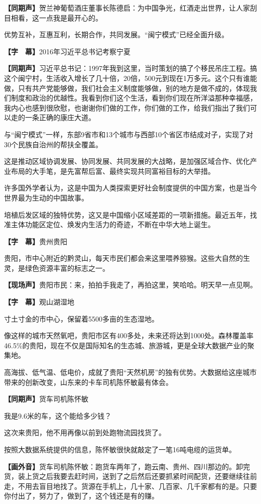 \documentclass{ctexart}
\newcommand{\zkh}[1]{\textbf{\hspace{-2.7em} 【#1】}}
\begin{document}
\zkh{同期声}贺兰神葡萄酒庄董事长陈德启：为中国争光，红酒走出世界，让人家刮目相看，这一点我是最开心的。

优势互补，互惠互利，长期合作，共同发展。``闽宁模式''已经全面升级。

\zkh{字　幕}2016年习近平总书记考察宁夏

\zkh{同期声}习近平总书记：1997年我到这里，当时策划的搞了个移民吊庄工程。搞这个闽宁村，生活收入增长了几十倍，20倍，500元到现在1万多元。这个只有谁能做，只有共产党能够做，我们社会主义制度能够做，别的地方是做不成的，体现我们制度和政治的优越性。我看到你们这个生活，看到你们现在所洋溢那种幸福感，我内心也感到很欣慰，也谢谢你们做的工作，你们做的工作，给我们指出了我们可以走的一条正确的康庄大道。

与``闽宁模式''一样，东部9省市和13个城市与西部10个省区市结成对子，实现了对30个民族自治州的帮扶全覆盖。

这是推动区域协调发展、协同发展、共同发展的大战略，是加强区域合作、优化产业布局的大手笔，是先富帮后富、最终实现共同富裕目标的大举措。

许多国外学者认为，这是中国为人类探索更好社会制度提供的中国方案，也是当今世界最为生动的中国故事。

培植后发区域的独特优势，这又是中国缩小区域差距的一项新措施。最近五年，找准主体功能区定位、焕发内生活力的奇迹，不断在中华大地上诞生。

\zkh{字　幕}贵州贵阳

贵阳，市中心附近的黔灵山，每天市民们都会来这里喂养猕猴。这些大自然的生灵，是绿色资源丰富的标志之一。

\zkh{现场声}贵阳市民：来，拍拍手我走了，再拍这里，笑哈哈。明天早一点见啊。

\zkh{字　幕}观山湖湿地

寸土寸金的市中心，保留着5500多亩的生态湿地。

像这样的城市天然氧吧，贵阳市区有400多处，未来还将达到1000处。森林覆盖率46.5{\%}的贵阳，现在不仅是国际知名的生态城、旅游城，更是全球大数据产业的聚集地。

高海拔、低气温、低电价，成就了贵阳``天然机房''的独有优势。大数据给这座城市带来的创新改变，山东来的卡车司机陈怀敏最有体会。

\zkh{同期声}货车司机陈怀敏

我是9.6米的车，这个能给多少钱？

这次来贵阳，他不用再像以前到处跑物流园找货了。

按照大数据系统提供的信息，陈怀敏很快就敲定了一笔16吨电缆的运货单。

\zkh{画外音}货车司机陈怀敏：跑货车两年了，跑云南、贵州、四川那边的。卸完货，装上货之后我要去赶时间，送到了之后然后还要抓紧时间配货，还要继续往前走，不用去盲目地找了。货源在手机上，几十家、几百家、几千家都有的是。只要你付出了，努力了，做到了，这个钱还是有的赚。
\end{document}
